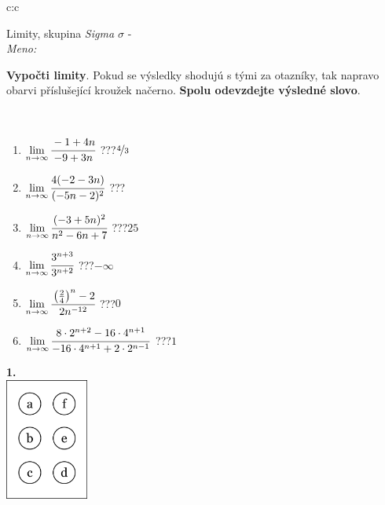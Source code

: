 \documentclass[10pt]{report}
\begin{document}
\begin{tabular}{c:c}
\begin{minipage}[c][104.5mm][t]{0.5\linewidth}
\begin{center}
\vspace{7mm}
{\huge Limity, skupina \textit{Sigma $\sigma$} -}\\[5mm]
\textit{Meno:}\phantom{xxxxxxxxxxxxxxxxxxxxxxxxxxxxxxxxxxxxxxxxxxxxxxxxxxxxxxxxxxxxxxxxx}\\[5mm]
\begin{minipage}{0.95\linewidth}
\begin{center}
\textbf{Vypočti limity}. Pokud se výsledky shodujú s tými za otazníky, tak napravo\\obarvi příslušející kroužek načerno. \textbf{Spolu odevzdejte výsledné slovo}.
\end{center}
\end{minipage}
\\[1mm]
\begin{minipage}{0.79\linewidth}
\begin{center}
\begin{varwidth}{\linewidth}
\begin{enumerate}
\normalsize
\item $\lim\limits_{n\to\infty}\cfrac{-1+4n}{-9+3n}$\quad \dotfill\; ???\;\dotfill \quad $\nicefrac{4}{3}$
\item $\lim\limits_{n\to\infty}\cfrac{4(-2-3n)}{(-5n-2)^2}$\quad \dotfill\; ???\;\dotfill {}
\item $\lim\limits_{n\to\infty}\cfrac{(-3+5n)^2}{n^2-6n+7}$\quad \dotfill\; ???\;\dotfill \quad $25$
\item $\lim\limits_{n\to\infty}\cfrac{3^{n+3}}{3^{n+2}}$\quad \dotfill\; ???\;\dotfill \quad $-\infty$
\item $\lim\limits_{n\to\infty}\cfrac{\left(\frac{2}{4}\right)^n -2}{2n^{-12}}$\quad \dotfill\; ???\;\dotfill \quad $0$
\item $\lim\limits_{n\to\infty}\cfrac{8\cdot 2^{n+2}-16\cdot 4^{n+1}}{-16\cdot 4^{n+1}+2\cdot 2^{n-1}}$\quad \dotfill\; ???\;\dotfill \quad $1$
\end{enumerate}
\end{varwidth}
\end{center}
\end{minipage}
\begin{minipage}{0.20\linewidth}
\begin{center}
{\Huge\bfseries 1.} \\[2mm]
\includegraphics[height=40mm]{../images/braille.png}

\end{center}
\end{minipage}
\end{center}
\end{minipage}
\end{tabular}
\end{document}
